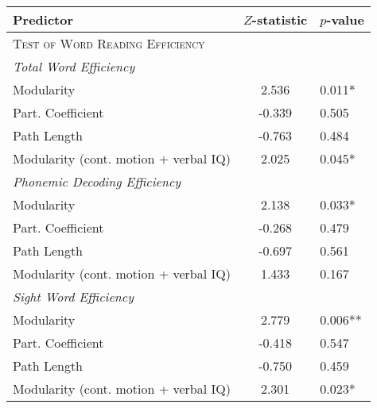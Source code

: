 \begin{tabular}{lcl}
\toprule
Predictor   &  $Z$-statistic &  $p$-value \\
\midrule
\textsc{Test of Word Reading Efficiency} & & \\
\textit{Total Word Efficiency} & & \\
    \hspace{5pt}Modularity &  2.536 &  0.011* \\
    \hspace{5pt}Part. Coefficient & -0.339 &  0.505 \\
    \hspace{5pt}Path Length & -0.763 &  0.484 \\
    \hspace{5pt}Modularity (cont. motion + verbal IQ) & 2.025 & 0.045* \\
\textit{Phonemic Decoding Efficiency} & & \\
    \hspace{5pt}Modularity  &  2.138 &  0.033* \\
    \hspace{5pt}Part. Coefficient & -0.268 &  0.479 \\
    \hspace{5pt}Path Length & -0.697 &  0.561 \\
    \hspace{5pt}Modularity (cont. motion + verbal IQ) & 1.433 & 0.167 \\
\textit{Sight Word Efficiency} & & \\
    \hspace{5pt}Modularity  &  2.779 &  0.006** \\
    \hspace{5pt}Part. Coefficient & -0.418 &  0.547 \\
    \hspace{5pt}Path Length & -0.750 &  0.459 \\
    \hspace{5pt}Modularity (cont. motion + verbal IQ) & 2.301 & 0.023* \\
\bottomrule
\end{tabular}